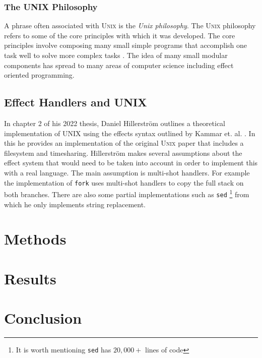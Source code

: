 \documentclass[logo,bsc,singlespacing,parskip]{infthesis}
\begin{document}
\subsection{The UNIX Philosophy}

A phrase often associated with \textsc{Unix} is the \emph{Unix philosophy}.  The
\textsc{Unix} philosophy refers to some of the core principles with which it was
developed. The core principles involve composing many small simple programs that
accomplish one task well to solve more complex tasks \cite{raymond2003art}. The
idea of many small modular components has spread to many areas of computer
science including effect oriented programming.

\section{Effect Handlers and UNIX}

In chapter 2 of his 2022 thesis, Daniel Hillerstr\"{o}m
\cite{hillerstrom2022foundations} outlines a theoretical implementation of UNIX
using the effects syntax outlined by Kammar et. al. \cite{kammar2013handlers}.
In this he provides an implementation of the original \textsc{Unix} paper
\cite{ritchie1978unix} that includes a filesystem and timesharing.
Hillerstr\"{o}m makes several assumptions about the effect system that would
need to be taken into account in order to implement this with a real language.
The main assumption is multi-shot handlers. For example the implementation of
\texttt{fork} uses multi-shot handlers to copy the full stack on both branches.
There are also some partial implementations such as \texttt{sed} \footnote{It is
worth mentioning \texttt{sed} has $20,000+$ lines of code} from which he only
implements string replacement.

\chapter{Methods}

\chapter{Results}

\chapter{Conclusion}



\end{document}
